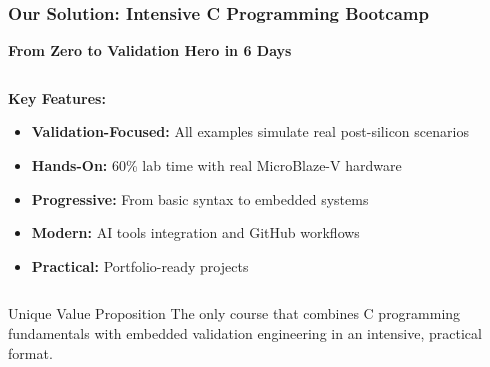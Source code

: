 \documentclass{beamer}
\begin{document}
\begin{frame}
\frametitle{Our Solution: Intensive C Programming Bootcamp}

\begin{center}
\Large \textbf{From Zero to Validation Hero in 6 Days}
\end{center}

\vspace{0.5cm}

\begin{columns}
\begin{column}{0.6\textwidth}
\textbf{Key Features:}
\begin{itemize}
    \item \textcolor{courseblue}{\textbf{Validation-Focused:}} All examples simulate real post-silicon scenarios
    \item \textcolor{courseblue}{\textbf{Hands-On:}} 60\% lab time with real MicroBlaze-V hardware
    \item \textcolor{courseblue}{\textbf{Progressive:}} From basic syntax to embedded systems
    \item \textcolor{courseblue}{\textbf{Modern:}} AI tools integration and GitHub workflows
    \item \textcolor{courseblue}{\textbf{Practical:}} Portfolio-ready projects
\end{itemize}
\end{column}
\begin{column}{0.4\textwidth}
\begin{center}
\end{center}
\end{column}
\end{columns}

\vspace{0.5cm}
\begin{exampleblock}{Unique Value Proposition}
The only course that combines C programming fundamentals with embedded validation engineering in an intensive, practical format.
\end{exampleblock}
\end{frame}
\end{document}
